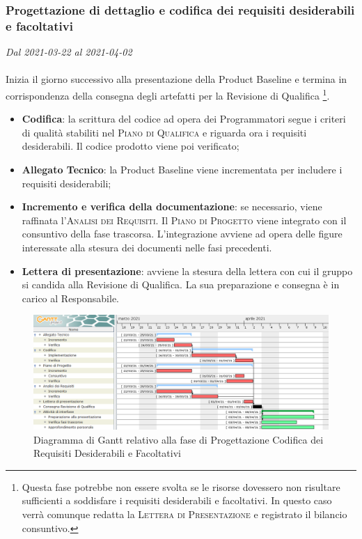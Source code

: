 \subsubsection{Progettazione di dettaglio e codifica dei requisiti desiderabili e facoltativi}

\textit{Dal 2021-03-22 al 2021-04-02}
\\\\
Inizia il giorno successivo alla presentazione della Product Baseline e termina in corrispondenza della consegna degli artefatti per la Revisione di Qualifica \footnote{Questa fase potrebbe non essere svolta se le risorse dovessero non risultare sufficienti a soddisfare i requisiti desiderabili e facoltativi. In questo caso verrà comunque redatta la \textsc{Lettera di Presentazione} e registrato il bilancio consuntivo.}.
\begin{itemize}
	\item \textbf{Codifica}: la scrittura del codice ad opera dei Programmatori segue i criteri di qualità stabiliti nel \textsc{Piano di Qualifica} e riguarda ora i requisiti desiderabili. Il codice prodotto viene poi verificato;
	\item \textbf{Allegato Tecnico}: la Product Baseline viene incrementata per includere i requisiti desiderabili;
	\item \textbf{Incremento e verifica della documentazione}: se necessario, viene raffinata l'\textsc{Analisi dei Requisiti}. Il \textsc{Piano di Progetto} viene integrato con il consuntivo della fase trascorsa. L'integrazione avviene ad opera delle figure interessate alla stesura dei documenti nelle fasi precedenti.
	\item \textbf{Lettera di presentazione}: avviene la stesura della lettera con cui il gruppo si candida alla Revisione di Qualifica. La sua preparazione e consegna è in carico al Responsabile.
	
\end{itemize}


\begin{figure}[H]
	\centering
	\includegraphics[scale=0.48]{res/images/05_gantt_codifica_desiderabili.png}
	\caption{Diagramma di Gantt relativo alla fase di Progettazione  Codifica dei Requisiti Desiderabili e Facoltativi}
\end{figure}




